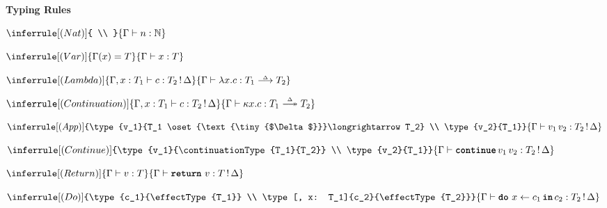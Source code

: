 \begin{figure}
  \begin{eff-desc}
    {\large\textbf{Typing Rules}}\\
    
    {
    \centering 
    \begin{minipage}[t]{0.2\textwidth}
      \centering
      $\inferrule[(Nat)]
      { \\ }
      {\type{n}{\mathbb{N}}}$
      \end{minipage}%
  \begin{minipage}[t]{0.2\textwidth}
    \centering
  $\inferrule[(Var)]
  {\Gamma(x) = T}
  {\type{x}{T}}$
  \end{minipage}%
  \begin{minipage}[t]{0.3\textwidth}
    \centering
  $\inferrule[(Lambda)]
    {\type[, x:T_1]{c}{\effectType{T_2}}}
    {\type{\function{x}{c}}{\functionType{T_1}{T_2}}}$
  \end{minipage}%
  \begin{minipage}[t]{0.3\textwidth}
  \centering
$\inferrule[(Continuation)]
  {\type[, x:T_1]{c}{\effectType{T_2}}}
  {\type{\continuation{x}{c}}{\continuationType{T_1}{T_2}}}$
\end{minipage}
  
  \vspace{5mm}
  
  \begin{minipage}[t]{0.5\textwidth}
    \centering
  $\inferrule[(App)]
    {\type{v_1}{T_1 \oset{\text{\tiny{$\Delta$}}}\longrightarrow T_2} \\ \type{v_2}{T_1}}
    {\type{v_1 \, v_2}{\effectType{T_2}}}$
  \end{minipage}%
  \begin{minipage}[t]{0.5\textwidth}
    \centering
  $\inferrule[(Continue)]
    {\type{v_1}{\continuationType{T_1}{T_2}} \\ \type{v_2}{T_1}}
    {\type{\continue{v_1}{v_2}}{\effectType{T_2}}}$
  \end{minipage}

  \vspace{5mm}

  \begin{minipage}[t]{0.3\textwidth}
    \centering
  $\inferrule[(Return)]
    {\type{v}{T}}
    {\type{\return{v}}{\effectType{T}}}$
  \end{minipage}%
  \begin{minipage}[t]{0.55\textwidth}
    \centering
  $\inferrule[(Do)]
    {\type{c_1}{\effectType{T_1}} \\ \type[, x: T_1]{c_2}{\effectType{T_2}}}
    {\type{\bind{x}{c_1}{c_2}}{\effectType{T_2}}}$
  \end{minipage}
  
}
\end{eff-desc}
\end{figure}
